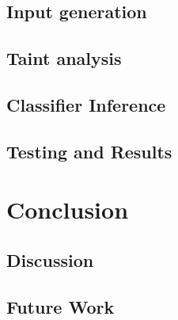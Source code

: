     \section{Input generation}
    \section{Taint analysis}
    \section{Classifier Inference}
    \section{Testing and Results}
\chapter{Conclusion}
\label{ch_conclusion}
    \section{Discussion}
    \section{Future Work}

